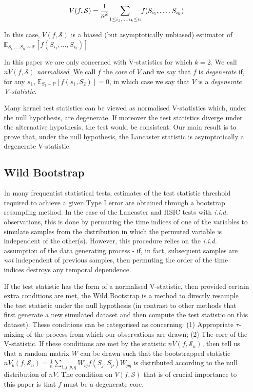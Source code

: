 \documentclass[]{article}
\begin{document}
\[ V(f,\mathcal{S}) =  \frac{1}{n^k} \mathlarger{\sum}_{1\leq i_1,\ldots, i_k \leq n} f(S_{i_1},\ldots,S_{i_k})\]

In this case, $V(f,\mathcal{S})$ is a biased (but asymptotically unbiased) estimator of $\mathbb{E}_{S_{i_1},\ldots S_{i_k} \sim \mathbb{P}}[f(S_{i_1},\ldots,S_{i_k})]$

In this paper we are only concerned with V-statistics for which $k=2$. We call $nV(f,\mathcal{S})$ \emph{normalised}. We call $f$ the \emph{core} of $V$ and we say that $f$ is \emph{degenerate} if, for any $s_1$, $\mathbb{E}_{S_2 \sim \mathbb{P}}[f(s_1,S_2)] = 0$, in which case we say that $V$ is a \emph{degenerate V-statistic}.

Many kernel test statistics can be viewed as normalised V-statistics which, under the null hypothesis, are degenerate. If moreover the test statistics diverge under the alternative hypothesis, the test would be consistent. Our main result is to prove that, under the null hypothesis, the Lancaster statistic is asymptotically a degenerate V-statistic.

\subsection{Wild Bootstrap}

In many frequentist statistical tests, estimates of the test statistic threshold required to achieve a given Type I error are obtained through a bootstrap resampling method. In the case of the Lancaster and HSIC tests with \emph{i.i.d. } observations, this is done by permuting the time indices of one of the variables to simulate samples from the distribution in which the permuted variable is independent of the other(s). However, this procedure relies on the \emph{i.i.d. } assumption of the data generating process - if, in fact, subsequent samples are \emph{not} independent of previous samples, then permuting the order of the time indices destroys any temporal dependence. 

If the test statistic has the form of a normalised V-statistic, then provided certain extra conditions are met, the Wild Bootstrap \cite{leucht2013dependent} is a method to directly resample the test statistic under the null hypothesis (in contrast to other methods that first generate a new simulated dataset and then compute the test statistic on this dataset). These conditions can be categorised as concerning: (1) Appropriate $\tau$-mixing of the process from which our observations are drawn; (2) The core of the V-statistic. If these conditions are met by the statistic $nV(f,\mathcal{S}_n)$, then \cite{leucht2013dependent} tell us that a random matrix $W$ can be drawn such that the bootstrapped statistic $nV_b(f,\mathcal{S}_n)=\frac{1}{n}\sum_{i,j,p,q}W_{ij}f(S_j,S_p)W_{pq}$ is distributed according to the null distribution of $nV$. The condition on $V(f,\mathcal{S})$ that is of crucial importance to this paper is that $f$ must be a degenerate core.
\end{document}
